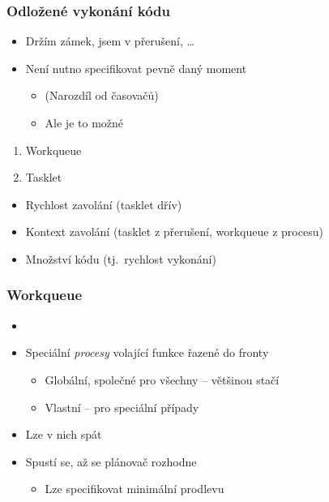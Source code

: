 \begin{frame}
  \frametitle{Odložené vykonání kódu}

  \begin{itemize}
    \item Držím zámek, jsem v přerušení, \dots

    \pause

    \item Není nutno specifikovat pevně daný moment
    \begin{itemize}
      \item (Narozdíl od časovačů)
      \item Ale je to možné
    \end{itemize}
  \end{itemize}

  \pause

  \begin{enumerate}
    \item Workqueue
    \item Tasklet
  \end{enumerate}

  \begin{itemize}
    \item Rychlost zavolání (tasklet dřív)
    \item Kontext zavolání (tasklet z přerušení, workqueue z procesu)
    \item Množství kódu (tj.\ rychlost vykonání)
  \end{itemize}

\end{frame}

\begin{frame}
  \frametitle{Workqueue}

  \begin{itemize}
    \item {}

    \item Speciální \emph{procesy} volající funkce řazené do fronty
    \begin{itemize}
      \item Globální, společné pro všechny -- většinou stačí

      \pause

      \item Vlastní -- pro speciální případy
    \end{itemize}

    \pause

    \item Lze v nich spát

    \item Spustí se, až se plánovač rozhodne
    \begin{itemize}
      \item Lze specifikovat minimální prodlevu
    \end{itemize}
  \end{itemize}

\end{frame}

